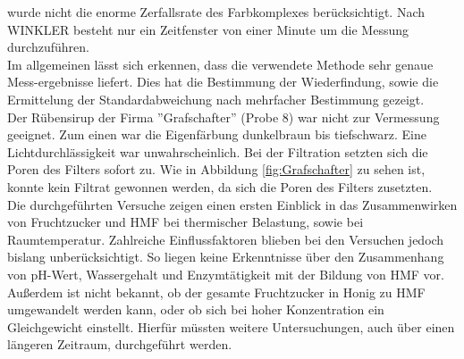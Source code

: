 wurde nicht die enorme Zerfallsrate des Farbkomplexes berücksichtigt. 
Nach WINKLER besteht nur ein Zeitfenster von einer Minute um die Messung durchzuführen.~\cite{Winkler}\\
Im allgemeinen lässt sich erkennen, dass die verwendete Methode sehr genaue Mess-ergebnisse liefert. Dies hat die Bestimmung der Wiederfindung, sowie die Ermittelung der Standardabweichung nach mehrfacher Bestimmung gezeigt.\\
Der Rübensirup der Firma ''Grafschafter'' (Probe 8) war nicht zur Vermessung geeignet. Zum einen war die Eigenfärbung dunkelbraun bis tiefschwarz. Eine Lichtdurchlässigkeit war unwahrscheinlich. Bei der Filtration setzten sich die Poren des Filters sofort zu. Wie in Abbildung \ref{fig:Grafschafter} zu sehen ist, konnte kein Filtrat gewonnen werden, da sich die Poren des Filters zusetzten.\\
Die durchgeführten Versuche zeigen einen ersten Einblick in das Zusammenwirken von Fruchtzucker und HMF bei thermischer Belastung, sowie bei Raumtemperatur. Zahlreiche Einflussfaktoren blieben bei den Versuchen jedoch bislang unberücksichtigt. So liegen keine Erkenntnisse über den Zusammenhang von pH-Wert, Wassergehalt und Enzymtätigkeit mit der Bildung von HMF vor. Außerdem ist nicht bekannt, ob der gesamte Fruchtzucker in Honig zu HMF umgewandelt werden kann, oder ob sich bei hoher Konzentration ein Gleichgewicht einstellt. Hierfür müssten weitere Untersuchungen, auch über einen längeren Zeitraum, durchgeführt werden.
